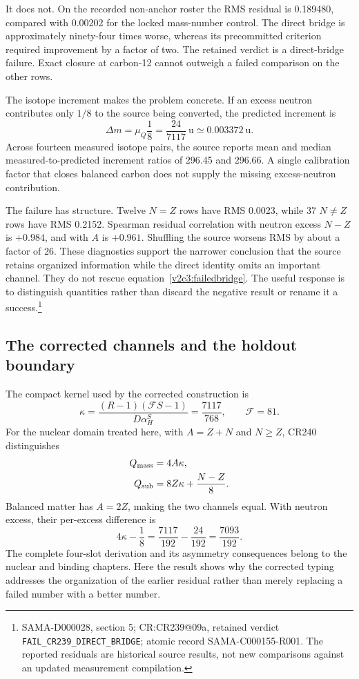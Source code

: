 It does not. On the recorded non-anchor roster the RMS residual is 0.189480, compared with 0.00202 for the locked mass-number control. The direct bridge is approximately ninety-four times worse, whereas its precommitted criterion required improvement by a factor of two. The retained verdict is a direct-bridge failure. Exact closure at carbon-12 cannot outweigh a failed comparison on the other rows.

The isotope increment makes the problem concrete. If an excess neutron contributes only $1/8$ to the source being converted, the predicted increment is
\begin{equation}
\Delta m=\mu_Q\frac18=\frac{24}{7117}\ \mathrm u
\simeq0.003372\ \mathrm u.
\end{equation}
Across fourteen measured isotope pairs, the source reports mean and median measured-to-predicted increment ratios of 296.45 and 296.66. A single calibration factor that closes balanced carbon does not supply the missing excess-neutron contribution.

The failure has structure. Twelve $N=Z$ rows have RMS 0.0023, while 37 $N\ne Z$ rows have RMS 0.2152. Spearman residual correlation with neutron excess $N-Z$ is $+0.984$, and with $A$ is $+0.961$. Shuffling the source worsens RMS by about a factor of 26. These diagnostics support the narrower conclusion that the source retains organized information while the direct identity omits an important channel. They do not rescue equation~\eqref{v2c3:failedbridge}. The useful response is to distinguish quantities rather than discard the negative result or rename it a success.\footnote{SAMA-D000028, section 5; CR:CR239@09a, retained verdict \texttt{FAIL\_CR239\_DIRECT\_BRIDGE}; atomic record SAMA-C000155-R001. The reported residuals are historical source results, not new comparisons against an updated measurement compilation.}

\subsection{The corrected channels and the holdout boundary}

The compact kernel used by the corrected construction is
\begin{equation}
\kappa=\frac{(R-1)(\mathcal F S-1)}{D\alpha_H^S}
=\frac{7117}{768},\qquad \mathcal F=81.
\end{equation}
For the nuclear domain treated here, with $A=Z+N$ and $N\ge Z$, CR240 distinguishes
\begin{align}
Q_{\rm mass}&=4A\kappa,\\
Q_{\rm sub}&=8Z\kappa+\frac{N-Z}{8}.
\label{v2c3:twochannels}
\end{align}
Balanced matter has $A=2Z$, making the two channels equal. With neutron excess, their per-excess difference is
\begin{equation}
4\kappa-\frac18
=\frac{7117}{192}-\frac{24}{192}
=\frac{7093}{192}.
\end{equation}
The complete four-slot derivation and its asymmetry consequences belong to the nuclear and binding chapters. Here the result shows why the corrected typing addresses the organization of the earlier residual rather than merely replacing a failed number with a better number.

